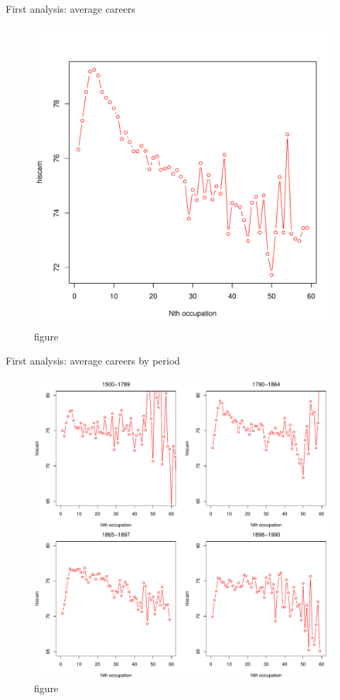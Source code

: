 \documentclass[ignorenonframetext,]{beamer}
\begin{document}
\begin{frame}{First analysis: average careers}

\begin{figure}[htbp]
\centering
\includegraphics{../figures/avgcareers.pdf}
\caption{figure}
\end{figure}

\end{frame}

\begin{frame}{First analysis: average careers by period}

\begin{figure}[htbp]
\centering
\includegraphics{../figures/avgcareers_byperiod.pdf}
\caption{figure}
\end{figure}

\end{frame}
\end{document}
